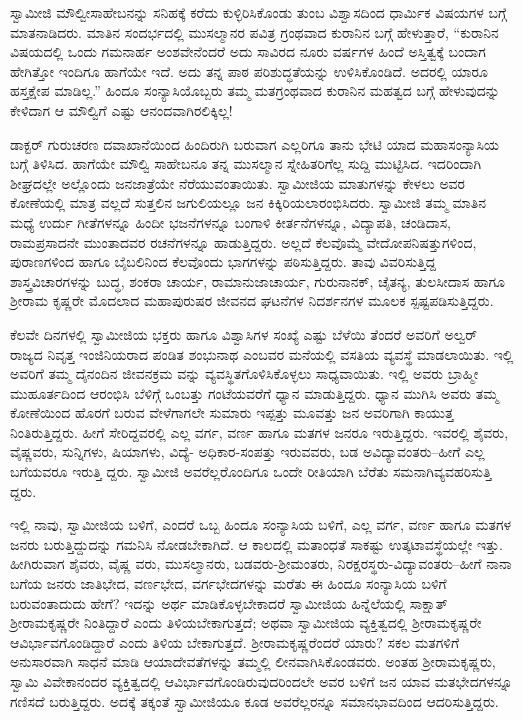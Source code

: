 ಸ್ವಾಮೀಜಿ ಮೌಲ್ವೀಸಾಹೇಬನನ್ನು ಸನಿಹಕ್ಕೆ ಕರೆದು ಕುಳ್ಳಿರಿಸಿಕೊಂಡು ತುಂಬ ವಿಶ್ವಾಸದಿಂದ ಧಾರ್ಮಿಕ ವಿಷಯಗಳ ಬಗ್ಗೆ ಮಾತನಾಡಿದರು. ಮಾತಿನ ಸಂದರ್ಭದಲ್ಲಿ ಮುಸಲ್ಮಾನರ ಪವಿತ್ರ ಗ್ರಂಥವಾದ ಕುರಾನಿನ ಬಗ್ಗೆ ಹೇಳುತ್ತಾರೆ, “ಕುರಾನಿನ ವಿಷಯದಲ್ಲಿ ಒಂದು ಗಮನಾರ್ಹ ಅಂಶವೇನೆಂದರೆ ಅದು ಸಾವಿರದ ನೂರು ವರ್ಷಗಳ ಹಿಂದೆ ಅಸ್ತಿತ್ವಕ್ಕೆ ಬಂದಾಗ ಹೇಗಿತ್ತೋ ಇಂದಿಗೂ ಹಾಗೆಯೇ ಇದೆ. ಅದು ತನ್ನ ಪಾಠ ಪರಿಶುದ್ಧತೆಯನ್ನು ಉಳಿಸಿಕೊಂಡಿದೆ. ಅದರಲ್ಲಿ ಯಾರೂ ಹಸ್ತಕ್ಷೇಪ ಮಾಡಿಲ್ಲ.” ಹಿಂದೂ ಸಂನ್ಯಾಸಿಯೊಬ್ಬರು ತಮ್ಮ ಮತಗ್ರಂಥವಾದ ಕುರಾನಿನ ಮಹತ್ವದ ಬಗ್ಗೆ ಹೇಳುವುದನ್ನು ಕೇಳಿದಾಗ ಆ ಮೌಲ್ವಿಗೆ ಎಷ್ಟು ಆನಂದವಾಗಿರಲಿಕ್ಕಿಲ್ಲ!

ಡಾಕ್ಟರ್ ಗುರುಚರಣ ದವಾಖಾನೆಯಿಂದ ಹಿಂದಿರುಗಿ ಬರುವಾಗ ಎಲ್ಲರಿಗೂ ತಾನು ಭೇಟಿ ಯಾದ ಮಹಾಸಂನ್ಯಾಸಿಯ ಬಗ್ಗೆ ತಿಳಿಸಿದ. ಹಾಗೆಯೇ ಮೌಲ್ವಿ ಸಾಹೇಬನೂ ತನ್ನ ಮುಸಲ್ಮಾನ ಸ್ನೇಹಿತರಿಗೆಲ್ಲ ಸುದ್ದಿ ಮುಟ್ಟಿಸಿದ. ಇದರಿಂದಾಗಿ ಶೀಘ್ರದಲ್ಲೇ ಅಲ್ಲೊಂದು ಜನಜಾತ್ರೆಯೇ ನೆರೆಯುವಂತಾಯಿತು. ಸ್ವಾಮೀಜಿಯ ಮಾತುಗಳನ್ನು ಕೇಳಲು ಅವರ ಕೋಣೆಯಲ್ಲಿ ಮಾತ್ರ ವಲ್ಲದೆ ಸುತ್ತಲಿನ ಜಗುಲಿಯಲ್ಲೂ ಜನ ಕಿಕ್ಕಿರಿಯಲಾರಂಭಿಸಿದರು. ಸ್ವಾಮೀಜಿ ತಮ್ಮ ಮಾತಿನ ಮಧ್ಯೆ ಉರ್ದು ಗೀತೆಗಳನ್ನೂ ಹಿಂದೀ ಭಜನೆಗಳನ್ನೂ ಬಂಗಾಳಿ ಕೀರ್ತನೆಗಳನ್ನೂ, ವಿದ್ಯಾಪತಿ, ಚಂಡಿದಾಸ, ರಾಮಪ್ರಸಾದನೇ ಮುಂತಾದವರ ರಚನೆಗಳನ್ನೂ ಹಾಡುತ್ತಿದ್ದರು. ಅಲ್ಲದೆ ಕೆಲವೊಮ್ಮೆ ವೇದೋಪನಿಷತ್ತುಗಳಿಂದ, ಪುರಾಣಗಳಿಂದ ಹಾಗೂ ಬೈಬಲಿನಿಂದ ಕೆಲವೊಂದು ಭಾಗಗಳನ್ನು ಪಠಿಸುತ್ತಿದ್ದರು. ತಾವು ವಿವರಿಸುತ್ತಿದ್ದ ಶಾಸ್ತ್ರವಿಚಾರಗಳನ್ನು ಬುದ್ಧ, ಶಂಕರಾ ಚಾರ್ಯ, ರಾಮಾನುಜಾಚಾರ್ಯ, ಗುರುನಾನಕ್, ಚೈತನ್ಯ, ತುಲಸೀದಾಸ ಹಾಗೂ ಶ್ರೀರಾಮ ಕೃಷ್ಣರೇ ಮೊದಲಾದ ಮಹಾಪುರುಷರ ಜೀವನದ ಘಟನೆಗಳ ನಿದರ್ಶನಗಳ ಮೂಲಕ ಸ್ಪಷ್ಟಪಡಿಸುತ್ತಿದ್ದರು.

ಕೆಲವೇ ದಿನಗಳಲ್ಲಿ ಸ್ವಾಮೀಜಿಯ ಭಕ್ತರು ಹಾಗೂ ವಿಶ್ವಾಸಿಗಳ ಸಂಖ್ಯೆ ಎಷ್ಟು ಬೆಳೆಯಿ ತೆಂದರೆ ಅವರಿಗೆ ಅಲ್ವರ್ ರಾಜ್ಯದ ನಿವೃತ್ತ ಇಂಜಿನಿಯರಾದ ಪಂಡಿತ ಶಂಭುನಾಥ ಎಂಬವರ ಮನೆಯಲ್ಲಿ ವಸತಿಯ ವ್ಯವಸ್ಥೆ ಮಾಡಲಾಯಿತು. ಇಲ್ಲಿ ಅವರಿಗೆ ತಮ್ಮ ದೈನಂದಿನ ಜೀವನಕ್ರಮ ವನ್ನು ವ್ಯವಸ್ಥಿತಗೊಳಿಸಿಕೊಳ್ಳಲು ಸಾಧ್ಯವಾಯಿತು. ಇಲ್ಲಿ ಅವರು ಬ್ರಾಹ್ಮೀ ಮುಹೂರ್ತದಿಂದ ಆರಂಭಿಸಿ ಬೆಳಿಗ್ಗೆ ಒಂಬತ್ತು ಗಂಟೆಯವರೆಗೆ ಧ್ಯಾನ ಮಾಡುತ್ತಿದ್ದರು. ಧ್ಯಾನ ಮುಗಿಸಿ ಅವರು ತಮ್ಮ ಕೋಣೆಯಿಂದ ಹೊರಗೆ ಬರುವ ವೇಳೆಗಾಗಲೇ ಸುಮಾರು ಇಪ್ಪತ್ತು ಮೂವತ್ತು ಜನ ಅವರಿಗಾಗಿ ಕಾಯುತ್ತ ನಿಂತಿರುತ್ತಿದ್ದರು. ಹೀಗೆ ಸೇರಿದ್ದವರಲ್ಲಿ ಎಲ್ಲ ವರ್ಗ, ವರ್ಣ ಹಾಗೂ ಮತಗಳ ಜನರೂ ಇರುತ್ತಿದ್ದರು. ಇವರಲ್ಲಿ ಶೈವರು, ವೈಷ್ಣವರು, ಸುನ್ನಿಗಳು, ಷಿಯಾಗಳು, ವಿದ್ಯೆ- ಅಧಿಕಾರ-ಸಂಪತ್ತು ಇರುವವರು, ಬಡ ಅವಿದ್ಯಾವಂತರು–ಹೀಗೆ ಎಲ್ಲ ಬಗೆಯವರೂ ಇರುತ್ತಿ ದ್ದರು. ಸ್ವಾಮೀಜಿ ಅವರೆಲ್ಲರೊಂದಿಗೂ ಒಂದೇ ರೀತಿಯಾಗಿ ಬೆರೆತು ಸಮನಾಗಿವ್ಯವಹರಿಸುತ್ತಿ ದ್ದರು.

ಇಲ್ಲಿ ನಾವು, ಸ್ವಾಮೀಜಿಯ ಬಳಿಗೆ, ಎಂದರೆ ಒಬ್ಬ ಹಿಂದೂ ಸಂನ್ಯಾಸಿಯ ಬಳಿಗೆ, ಎಲ್ಲ ವರ್ಗ, ವರ್ಣ ಹಾಗೂ ಮತಗಳ ಜನರು ಬರುತ್ತಿದ್ದುದನ್ನು ಗಮನಿಸಿ ನೋಡಬೇಕಾಗಿದೆ. ಆ ಕಾಲದಲ್ಲಿ ಮತಾಂಧತೆ ಸಾಕಷ್ಟು ಉತ್ಕಟಾವಸ್ಥೆಯಲ್ಲೇ ಇತ್ತು. ಹೀಗಿರುವಾಗ ಶೈವರು, ವೈಷ್ಣ ವರು, ಮುಸಲ್ಮಾನರು, ಬಡವರು-ಶ್ರೀಮಂತರು, ನಿರಕ್ಷರಸ್ಥರು-ವಿದ್ಯಾವಂತರು–ಹೀಗೆ ನಾನಾ ಬಗೆಯ ಜನರು ಜಾತಿಭೇದ, ವರ್ಣಭೇದ, ವರ್ಗಭೇದಗಳನ್ನು ಮರೆತು ಈ ಹಿಂದೂ ಸಂನ್ಯಾಸಿಯ ಬಳಿಗೆ ಬರುವಂತಾದುದು ಹೇಗೆ? ಇದನ್ನು ಅರ್ಥ ಮಾಡಿಕೊಳ್ಳಬೇಕಾದರೆ ಸ್ವಾಮೀಜಿಯ ಹಿನ್ನೆಲೆಯಲ್ಲಿ ಸಾಕ್ಷಾತ್ ಶ್ರೀರಾಮಕೃಷ್ಣರೇ ನಿಂತಿದ್ದಾರೆ ಎಂದು ತಿಳಿಯಬೇಕಾಗುತ್ತದೆ; ಅಥವಾ ಸ್ವಾಮೀಜಿಯ ವ್ಯಕ್ತಿತ್ವದಲ್ಲಿ ಶ್ರೀರಾಮಕೃಷ್ಣರೇ ಆವಿರ್ಭಾವಗೊಂಡಿದ್ದಾರೆ ಎಂದು ತಿಳಿಯ ಬೇಕಾಗುತ್ತದೆ. ಶ್ರೀರಾಮಕೃಷ್ಣರೆಂದರೆ ಯಾರು? ಸಕಲ ಮತಗಳಿಗೆ ಅನುಸಾರವಾಗಿ ಸಾಧನೆ ಮಾಡಿ ಆಯಾದೇವತೆಗಳನ್ನು ತಮ್ಮಲ್ಲಿ ಲೀನವಾಗಿಸಿಕೊಂಡವರು. ಅಂತಹ ಶ್ರೀರಾಮಕೃಷ್ಣರು, ಸ್ವಾಮಿ ವಿವೇಕಾನಂದರ ವ್ಯಕ್ತಿತ್ವದಲ್ಲಿ ಆವಿರ್ಭಾವಗೊಂಡಿರುವುದರಿಂದಲೇ ಅವರ ಬಳಿಗೆ ಜನ ಯಾವ ಮತಭೇದಗಳನ್ನೂ ಗಣಿಸದೆ ಬರುತ್ತಿದ್ದರು. ಅದಕ್ಕೆ ತಕ್ಕಂತೆ ಸ್ವಾಮೀಜಿಯೂ ಕೂಡ ಅವರೆಲ್ಲರನ್ನೂ ಸಮಾನಭಾವದಿಂದ ಆದರಿಸುತ್ತಿದ್ದರು.

